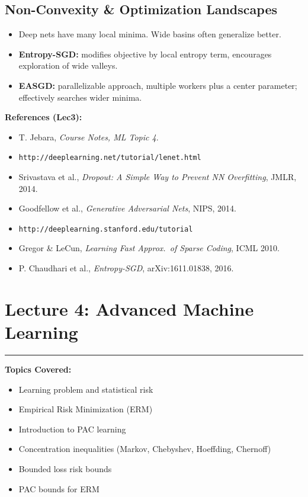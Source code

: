 \documentclass[10pt]{article}
\begin{document}
\begin{multicols}{2}
\subsection*{Non-Convexity \& Optimization Landscapes}
\begin{itemize}
\item Deep nets have many local minima. Wide basins often generalize better.
\item \textbf{Entropy-SGD:} modifies objective by local entropy term, encourages exploration of wide valleys.
\item \textbf{EASGD:} parallelizable approach, multiple workers plus a center parameter; effectively searches wider minima.
\end{itemize}

\vfill
\textbf{References (Lec3):}
\begin{itemize}\setlength{\itemsep}{0pt}
\item T. Jebara, \emph{Course Notes, ML Topic 4}.
\item \texttt{http://deeplearning.net/tutorial/lenet.html}
\item Srivastava et al., \emph{Dropout: A Simple Way to Prevent NN Overfitting}, JMLR, 2014.
\item Goodfellow et al., \emph{Generative Adversarial Nets}, NIPS, 2014.
\item \texttt{http://deeplearning.stanford.edu/tutorial}
\item Gregor \& LeCun, \emph{Learning Fast Approx.\ of Sparse Coding}, ICML 2010.
\item P. Chaudhari et al., \emph{Entropy-SGD}, arXiv:1611.01838, 2016.
\end{itemize}


\section*{Lecture 4: Advanced Machine Learning}
\vspace{-0.5em}
\hrule
\vspace{1em}

\textbf{Topics Covered:}
\begin{itemize}
\item Learning problem and statistical risk
\item Empirical Risk Minimization (ERM)
\item Introduction to PAC learning
\item Concentration inequalities (Markov, Chebyshev, Hoeffding, Chernoff)
\item Bounded loss risk bounds
\item PAC bounds for ERM
\end{itemize}


\end{multicols}
\end{document}
